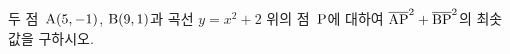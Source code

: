 두 점~$\mathrm{A}(5{,}\mkern3mu\mathopen{}-1)$, $\mathrm{B}(9{,}\mkern3mu\mathopen{}1)$과 곡선 $y=x^2+2$ 위의 점~$\mathrm{P}$에 대하여 $\overline{\mathrm{AP}}^2+\overline{\mathrm{BP}}^2$의 최솟값을 구하시오.
